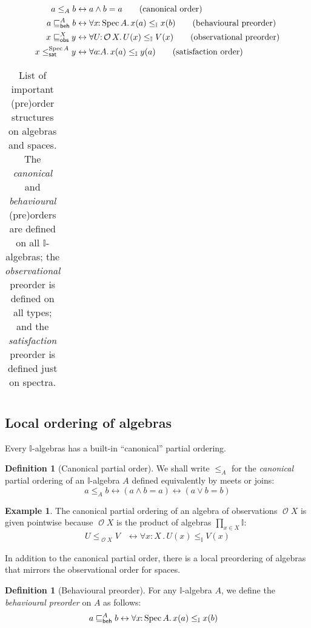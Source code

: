 \documentclass[a4paper,12pt]{amsart}
\theoremstyle{definition}
\newtheorem{example}[theorem]{Example}
\newtheorem{definition}[theorem]{Definition}
\newcommand{\mc}[1]{\mathcal{#1}}
\newcommand{\mbb}[1]{\mathbb{#1}}
\newcommand{\I}{\mbb I}
\newcommand{\fa}[2]{\forall #1\!\colon\!\!#2\mathpunct{.}}
\newcommand{\eq}{\leftrightarrow}
\newcommand{\spec}{\operatorname{Spec}}
\newcommand{\opens}{\operatorname{\mc{O}}} %
\begin{document}
\begin{table}[ht]
  \begin{align*}
    a\le_A b &\eq a\wedge b = a
    \tag{canonical order}
    \\
    a\behle[A]b &\eq 
    \fa{x}{\spec{A}}x(a)\le_\I x(b)
    \tag{behavioural preorder}
    \\
    x\obsle[X]y &\eq \fa{U}{\opens{X}} U(x)\le_\I V(x)
    \tag{observational preorder}
    \\ 
    x\satle[\spec{A}]y &\eq \fa{a}{A} x(a)\le_\I y(a)
    \tag{satisfaction order}
  \end{align*}
  \begin{tabular}{ll}
  \end{tabular}
  \caption{List of important (pre)order structures on algebras and spaces. The \emph{canonical} and \emph{behavioural} (pre)orders are defined on all $\I$-algebras; the \emph{observational} preorder is defined on all types; and the \emph{satisfaction} preorder is defined just on spectra.}
  \label{table:orders}
\end{table}


\subsection{Local ordering of algebras}

Every $\I$-algebras has a built-in ``canonical'' partial ordering.

\begin{definition}[Canonical partial order]
  We shall write $\le_A$ for the \emph{canonical} partial ordering of an $\I$-algebra $A$ defined equivalently by meets or joins:
  \[ 
    a\le_A b \eq (a\wedge b = a) \eq (a\vee b = b)
  \]
\end{definition}

\begin{example}
  The canonical partial ordering of an algebra of observations $\opens{X}$ is given pointwise because $\opens{X}$ is the product of algebras $\prod_{x\in X}\I$:
  \begin{align*}
    U\le_{\opens{X}} V 
    &\eq \fa{x}{X} U(x)\le_\I V(x)
  \end{align*}
\end{example}

In addition to the canonical partial order, there is a local preordering of algebras that mirrors the observational order for spaces.

\begin{definition}[Behavioural preorder]
  For any $\I$-algebra $A$, we define the \emph{behavioural preorder} on $A$ as follows:
  \begin{align*}
    a \behle[A] b &\eq \fa{x}{\spec{A}} x(a) \le_{\I} x(b)
  \end{align*}
\end{definition}
\end{document}
